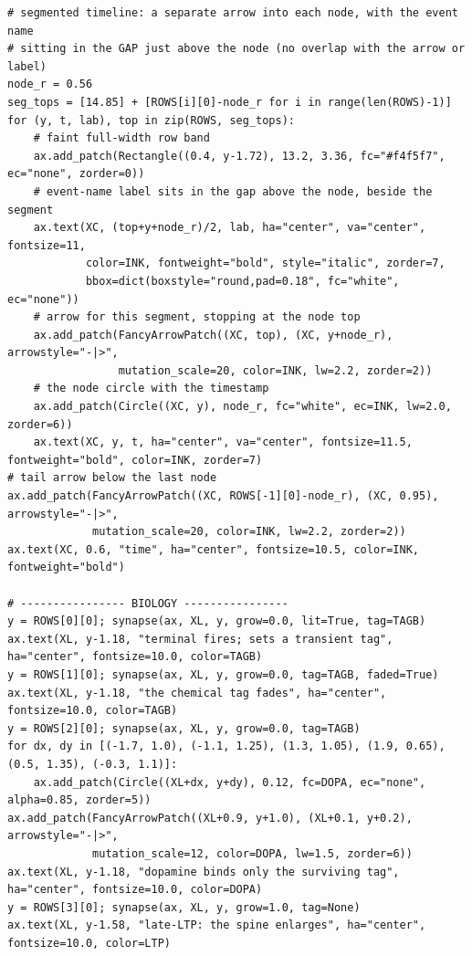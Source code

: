 \begin{lstlisting}[caption={schematics.ipynb code cell 5},label={lst:mrl-nb-schematics-5}]
# segmented timeline: a separate arrow into each node, with the event name
# sitting in the GAP just above the node (no overlap with the arrow or label)
node_r = 0.56
seg_tops = [14.85] + [ROWS[i][0]-node_r for i in range(len(ROWS)-1)]
for (y, t, lab), top in zip(ROWS, seg_tops):
    # faint full-width row band
    ax.add_patch(Rectangle((0.4, y-1.72), 13.2, 3.36, fc="#f4f5f7", ec="none", zorder=0))
    # event-name label sits in the gap above the node, beside the segment
    ax.text(XC, (top+y+node_r)/2, lab, ha="center", va="center", fontsize=11,
            color=INK, fontweight="bold", style="italic", zorder=7,
            bbox=dict(boxstyle="round,pad=0.18", fc="white", ec="none"))
    # arrow for this segment, stopping at the node top
    ax.add_patch(FancyArrowPatch((XC, top), (XC, y+node_r), arrowstyle="-|>",
                 mutation_scale=20, color=INK, lw=2.2, zorder=2))
    # the node circle with the timestamp
    ax.add_patch(Circle((XC, y), node_r, fc="white", ec=INK, lw=2.0, zorder=6))
    ax.text(XC, y, t, ha="center", va="center", fontsize=11.5, fontweight="bold", color=INK, zorder=7)
# tail arrow below the last node
ax.add_patch(FancyArrowPatch((XC, ROWS[-1][0]-node_r), (XC, 0.95), arrowstyle="-|>",
             mutation_scale=20, color=INK, lw=2.2, zorder=2))
ax.text(XC, 0.6, "time", ha="center", fontsize=10.5, color=INK, fontweight="bold")

# ---------------- BIOLOGY ----------------
y = ROWS[0][0]; synapse(ax, XL, y, grow=0.0, lit=True, tag=TAGB)
ax.text(XL, y-1.18, "terminal fires; sets a transient tag", ha="center", fontsize=10.0, color=TAGB)
y = ROWS[1][0]; synapse(ax, XL, y, grow=0.0, tag=TAGB, faded=True)
ax.text(XL, y-1.18, "the chemical tag fades", ha="center", fontsize=10.0, color=TAGB)
y = ROWS[2][0]; synapse(ax, XL, y, grow=0.0, tag=TAGB)
for dx, dy in [(-1.7, 1.0), (-1.1, 1.25), (1.3, 1.05), (1.9, 0.65), (0.5, 1.35), (-0.3, 1.1)]:
    ax.add_patch(Circle((XL+dx, y+dy), 0.12, fc=DOPA, ec="none", alpha=0.85, zorder=5))
ax.add_patch(FancyArrowPatch((XL+0.9, y+1.0), (XL+0.1, y+0.2), arrowstyle="-|>",
             mutation_scale=12, color=DOPA, lw=1.5, zorder=6))
ax.text(XL, y-1.18, "dopamine binds only the surviving tag", ha="center", fontsize=10.0, color=DOPA)
y = ROWS[3][0]; synapse(ax, XL, y, grow=1.0, tag=None)
ax.text(XL, y-1.58, "late-LTP: the spine enlarges", ha="center", fontsize=10.0, color=LTP)


\end{lstlisting}
